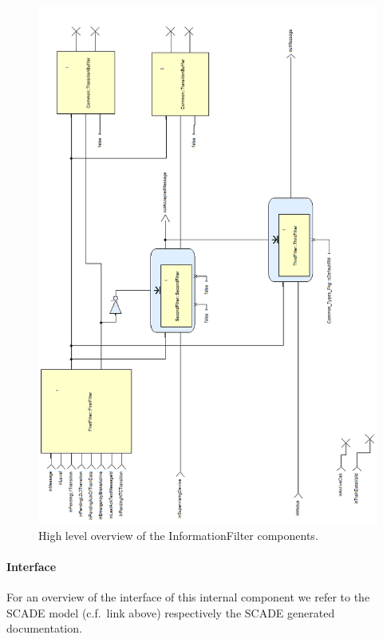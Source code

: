 \begin{figure}
\centering
\includegraphics [width=\textwidth]{images/informationfilter-high-level-rot.png}
\caption{High level overview of the InformationFilter components.}
\label{fig:InformationFilterHighLevel}
\end{figure}

\paragraph{Interface}

For an overview of the interface of this internal component we refer to the SCADE model (c.f.~link above) respectively the SCADE generated documentation.